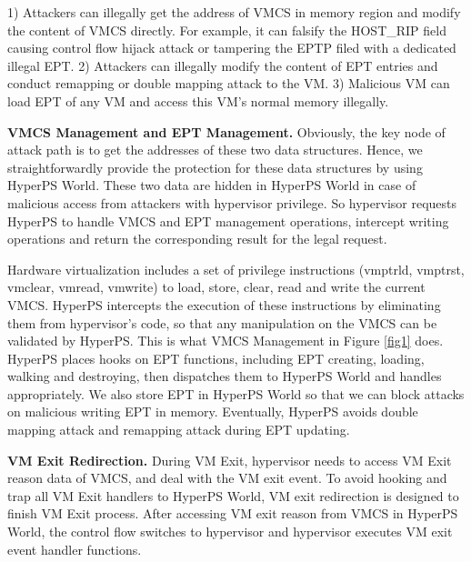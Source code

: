 ﻿\documentclass[conference]{IEEEtran}
\begin{document}
1) Attackers can illegally get the address of VMCS in memory region and modify the content of VMCS directly. For example, it can falsify the HOST\_RIP field causing control flow hijack attack or tampering the EPTP filed with a dedicated illegal EPT.
2) Attackers can illegally modify the content of EPT entries
and conduct remapping or double mapping attack to the VM.
3) Malicious VM can load EPT of any VM and access this VM's normal memory illegally.

\textbf{VMCS Management and EPT Management.}
Obviously, the key node of attack path is to get the addresses of these two data structures.
Hence, we straightforwardly provide the protection for these data structures by using HyperPS World. These two data are hidden in HyperPS World in case of malicious access from attackers with hypervisor privilege. 
So hypervisor requests HyperPS to handle VMCS and EPT management operations, intercept writing operations and return the corresponding result for the legal request. 

Hardware virtualization includes a set of privilege instructions (vmptrld, vmptrst, vmclear, vmread, vmwrite) to load, store, clear, read and write the current VMCS. HyperPS intercepts the execution of these instructions by eliminating them from hypervisor's code, so that any manipulation on the VMCS can be validated by HyperPS. This is what VMCS Management in Figure \ref{fig1} does.
HyperPS places hooks on  EPT functions, including EPT creating, loading, walking and destroying, then dispatches them to HyperPS World and handles appropriately.
We also store EPT in HyperPS World so that we can block attacks on malicious writing EPT in memory. Eventually, HyperPS avoids double mapping attack and remapping attack during EPT updating.

\textbf{VM Exit Redirection.}
During VM Exit, hypervisor needs to access VM Exit reason data of VMCS, and deal with the VM exit event.
 To avoid hooking and trap all VM Exit handlers to HyperPS World, VM exit redirection is designed to finish VM Exit process. After accessing VM exit reason from VMCS in HyperPS World, the control flow switches to hypervisor and hypervisor executes VM exit event handler functions.
\end{document}
